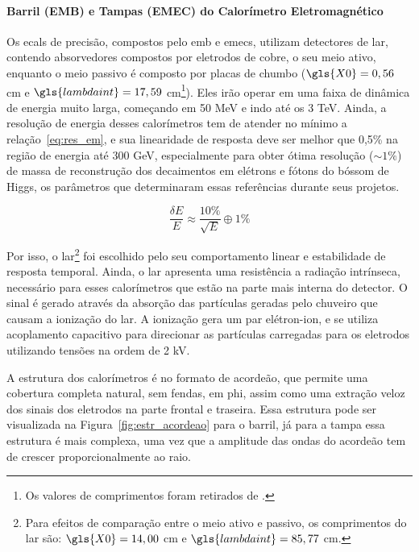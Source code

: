 \paragraph{Barril (EMB) e Tampas (EMEC) do Calorímetro Eletromagnético}
\label{par:ecal_prec}

Os \glspl{ecal} de precisão, compostos pelo \gls{emb} e \glspl{emec}, 
utilizam detectores de \gls{lar}, contendo absorvedores compostos por eletrodos 
de cobre, o seu meio ativo, enquanto o meio passivo é composto por placas de
chumbo ($\gls{X0}=0,56$ cm e $\gls{lambdaint}=17,59$ cm\footnote{Os valores de
comprimentos foram retirados de \cite{pdg_comp}.\label{fn:comp_rad_nucl}}). Eles
irão operar em uma faixa de dinâmica de energia muito larga, começando em 50 MeV
e indo até os 3 TeV. Ainda, a resolução de energia desses calorímetros tem de
atender no mínimo a relação~\ref{eq:res_em}, e sua linearidade de resposta deve ser melhor 
que 0,5\% na região de energia até 300 GeV, especialmente para obter ótima 
resolução ($\sim1\%$) de massa de reconstrução dos decaimentos em elétrons e fótons 
do bóssom de Higgs, os parâmetros que determinaram essas referências durante
seus projetos. 

\begin{equation}\label{eq:res_em}
\frac{\delta E}{E} \approx \frac{10\%}{\sqrt{E}} \oplus 1\%
\end{equation}

Por isso, o \gls{lar}\footnote{Para efeitos de comparação entre o meio ativo e passivo, 
os comprimentos do \gls{lar} são: $\gls{X0}=14,00$ cm e $\gls{lambdaint}=85,77$
cm.} foi escolhido pelo seu comportamento linear e estabilidade de resposta temporal. 
Ainda, o \gls{lar} apresenta uma resistência a radiação intrínseca, necessário
para esses calorímetros que estão na parte mais interna do detector. O sinal é gerado
através da absorção das partículas geradas pelo chuveiro que causam a ionização
do \gls{lar}. A ionização gera um par elétron-ion, e se utiliza acoplamento
capacitivo para direcionar as partículas carregadas para os eletrodos
utilizando tensões na ordem de 2 kV.

A estrutura dos calorímetros é no formato de acordeão, que permite uma cobertura
completa natural, sem fendas, em \gls{phi}, assim como uma extração veloz dos sinais dos eletrodos 
na parte frontal e traseira. Essa estrutura pode ser visualizada na Figura~\ref{fig:estr_acordeao}
para o barril, já para a tampa essa estrutura é mais complexa, uma
vez que a amplitude das ondas do acordeão tem de crescer proporcionalmente ao
raio. 

